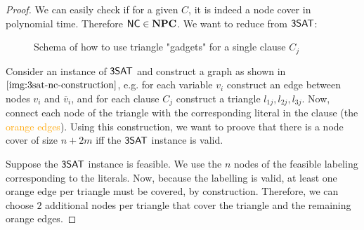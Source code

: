 \begin{proof}
    We can easily check if for a given $C$, it is indeed a node cover in polynomial time. Therefore $\mathsf{NC} \in \mathbf{NPC}$.
    We want to reduce from $\mathsf{3SAT}$:
    \begin{figure}[htbp]
        \centering
        \caption{Schema of how to use triangle "gadgets" for a single clause $C_j$}
        \label{img:3sat-nc-construction}
    \end{figure}

    Consider an instance of $\mathsf{3SAT}$ and construct a graph as shown in $\autoref{img:3sat-nc-construction}$, e.g.
    for each variable $v_i$ construct an edge between nodes $v_i$ and $\overline{v}_i$, and
    for each clause $C_j$ construct a triangle $l_{1j}, l_{2j}, l_{3j}$. Now, connect each node
    of the triangle with the corresponding literal in the clause (the \textcolor{orange}{orange edges}).
    Using this construction, we want to proove that there is a node cover of size $n+2m$ iff the $\mathsf{3SAT}$ instance is valid.

    Suppose the $\mathsf{3SAT}$ instance is feasible. We use the $n$ nodes of the feasible labeling corresponding to the literals.
    Now, because the labelling is valid, at least one orange edge per triangle must be covered, by construction.
    Therefore, we can choose $2$ additional nodes per triangle that cover the triangle and the remaining orange edges.


\end{proof}
